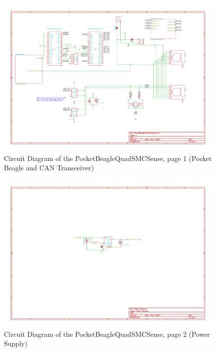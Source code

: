 \begin{figure}[hbpt]\begin{centering}%
\includegraphics[width=5in]{PocketBeagleQuadSMCSense-1.pdf}
\caption{Circuit Diagram of the PocketBeagleQuadSMCSense, page 1 (Pocket 
Beagle and CAN Transceiver)}
\end{centering}\end{figure}
\begin{figure}[hbpt]\begin{centering}%
\includegraphics[width=5in]{PocketBeagleQuadSMCSense-2.pdf}
\caption{Circuit Diagram of the PocketBeagleQuadSMCSense, page 2 (Power Supply)}
\end{centering}\end{figure}
